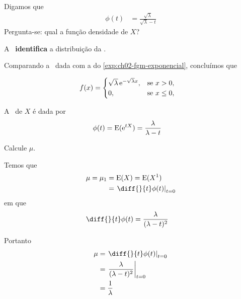Digamos que
\begin{align*}
    \phi(t) &= \frac{\sqrt{\lambda}}{\sqrt{\lambda} - t}
\end{align*}
Pergunta-se: qual a função densidade de $X$?

\begin{result}
    A \fgm\ \textbf{identifica} a distribuição da \va.
\end{result}

Comparando a \fgm\ dada com a do \cref{exp:ch02-fgm-exponencial},
concluímos que
    
\begin{align*}
    f(x) &= \begin{cases}
        \sqrt{\lambda} \operatorname{e}^{-\sqrt{\lambda} x}, 
        & \text{se } x > 0, \\
        0, & \text{se } x \leq 0,
    \end{cases}
\end{align*}

\begin{example}
    A \fgm\ de $X$ é dada por
    \begin{align*}
        \phi(t) = \operatorname{E}(\operatorname{e}^{tX})
        &= \frac{\lambda}{\lambda - t}
    \end{align*}

    Calcule $\mu$.

    \bigskip
    Temos que
    \begin{align*}
        \mu = \mu_1 &= \Expected(X) =  \Expected(X^1) \\
        &= \left.\diff{}{t}\phi(t)\right|_{t=0}
    \end{align*}
    em que
    \begin{align*}
        \diff{}{t}\phi(t) &= \frac{\lambda}{(\lambda - t)^2}
    \end{align*}
    
    Portanto
    \begin{align*}
        \mu &= \left.\diff{}{t}\phi(t)\right|_{t=0} \\
        &= \left.\frac{\lambda}{(\lambda - t)^2}\right|_{t=0} \\
        &= \frac{1}{\lambda} \\
    \end{align*}
\end{example}

